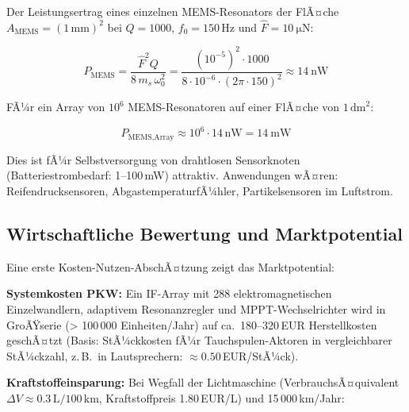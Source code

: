 ﻿\documentclass[12pt, a4paper]{report}
\theoremstyle{definition}
\theoremstyle{remark}
\begin{document}
Der Leistungsertrag eines einzelnen MEMS-Resonators der FlÃ¤che
$A_{\text{MEMS}} = (1\,\text{mm})^2$ bei $Q = 1000$, $f_0 = 150\,\text{Hz}$
und $\hat{F} = \SI{10}{\micro\newton}$:

\begin{equation}
  P_{\text{MEMS}} = \frac{\hat{F}^2 Q}{8\,m_s\,\omega_0^2}
  = \frac{(10^{-5})^2 \cdot 1000}{8 \cdot 10^{-6} \cdot (2\pi\cdot150)^2}
  \approx \SI{14}{\nano\watt}
  \label{eq:p_mems}
\end{equation}

FÃ¼r ein Array von $10^6$ MEMS-Resonatoren auf einer FlÃ¤che von $1\,\text{dm}^2$:

\begin{equation}
  P_{\text{MEMS,Array}} \approx 10^6 \cdot 14\,\text{nW} = \SI{14}{\milli\watt}
  \label{eq:p_mems_array}
\end{equation}

Dies ist fÃ¼r Selbstversorgung von drahtlosen Sensor\-knoten
(Batteriestrom\-bedarf: 1--100\,mW) attraktiv. Anwendungen wÃ¤ren:
Reifendrucksensoren, AbgastemperaturfÃ¼hler, Partikel\-sensoren im Luftstrom.

\subsection{Wirtschaftliche Bewertung und Marktpotential}
\label{ssec:ausblick_wirtschaft}

Eine erste Kosten-Nutzen-AbschÃ¤tzung zeigt das Marktpotential:

\textbf{Systemkosten PKW:} Ein IF-Array mit 288 elektromagnetischen Einzel\-wandlern,
adaptivem Resonanzregler und MPPT-Wechselrichter wird in GroÃŸ\-serie
(> 100\,000 Einheiten/Jahr) auf ca.\ 180--320\,EUR Herstell\-kosten
geschÃ¤tzt (Basis: StÃ¼ckkosten fÃ¼r Tauchspulen-Aktoren in vergleichbarer
StÃ¼ckzahl, z.\,B.\ in Lautsprechern: $\approx 0.50$\,EUR/StÃ¼ck).

\textbf{Kraftstoffeinsparung:} Bei Wegfall der Lichtmaschine
(VerbrauchsÃ¤quivalent $\Delta V \approx 0.3\,\text{L}/100\,\text{km}$,
Kraftstoffpreis 1.80\,EUR/L) und 15\,000\,km/Jahr:
\end{document}
